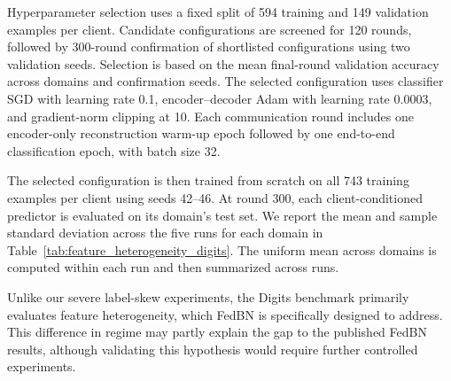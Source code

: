 Hyperparameter selection uses a fixed split of 594 training and 149
validation examples per client. Candidate configurations are screened for
120 rounds, followed by 300-round confirmation of shortlisted
configurations using two validation seeds. Selection is based on the mean
final-round validation accuracy across domains and confirmation seeds.
The selected configuration uses classifier SGD with learning rate 0.1,
encoder--decoder Adam with learning rate 0.0003, and gradient-norm clipping
at 10. Each communication round includes one encoder-only reconstruction
warm-up epoch followed by one end-to-end classification epoch, with batch
size 32.

The selected configuration is then trained from scratch on all 743
training examples per client using seeds 42--46. At round 300, each
client-conditioned predictor is evaluated on its domain's test set.
We report the mean and sample standard deviation across the five runs
for each domain in Table~\ref{tab:feature_heterogeneity_digits}.
The uniform mean across domains is computed within each run and then
summarized across runs.

Unlike our severe label-skew experiments, the Digits benchmark primarily
evaluates feature heterogeneity, which FedBN is specifically designed to
address. This difference in regime may partly explain the gap to the
published FedBN results, although validating this hypothesis would
require further controlled experiments.
